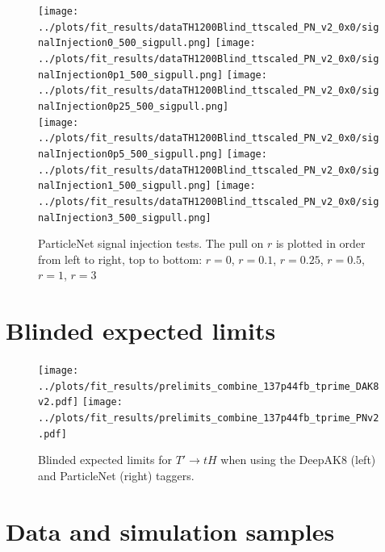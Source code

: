 \documentclass[10pt,oneside]{article}
\begin{document}
\begin{figure}[H]
    \centering
    \texttt{[image: ../plots/fit\_results/dataTH1200Blind\_ttscaled\_PN\_v2\_0x0/signalInjection0\_500\_sigpull.png]}
    \texttt{[image: ../plots/fit\_results/dataTH1200Blind\_ttscaled\_PN\_v2\_0x0/signalInjection0p1\_500\_sigpull.png]}
    \texttt{[image: ../plots/fit\_results/dataTH1200Blind\_ttscaled\_PN\_v2\_0x0/signalInjection0p25\_500\_sigpull.png]}\\
    \texttt{[image: ../plots/fit\_results/dataTH1200Blind\_ttscaled\_PN\_v2\_0x0/signalInjection0p5\_500\_sigpull.png]}
    \texttt{[image: ../plots/fit\_results/dataTH1200Blind\_ttscaled\_PN\_v2\_0x0/signalInjection1\_500\_sigpull.png]}
    \texttt{[image: ../plots/fit\_results/dataTH1200Blind\_ttscaled\_PN\_v2\_0x0/signalInjection3\_500\_sigpull.png]}
    \caption{ParticleNet signal injection tests. The pull on $r$ is plotted in order from left to right, top to bottom: $r=0$, $r=0.1$, $r=0.25$, $r=0.5$, $r=1$, $r=3$}
    \label{figs:sigInjPN}
\end{figure}

\section{Blinded expected limits}

\begin{figure}[H]
    \centering
    \texttt{[image: ../plots/fit\_results/prelimits\_combine\_137p44fb\_tprime\_DAK8v2.pdf]}
    \texttt{[image: ../plots/fit\_results/prelimits\_combine\_137p44fb\_tprime\_PNv2.pdf]}
    \caption{Blinded expected limits for $T' \to tH$ when using the DeepAK8 (left) and ParticleNet (right) taggers.}
    \label{figs:blindedLimits}
\end{figure}

\section{Data and simulation samples}
\end{document}
